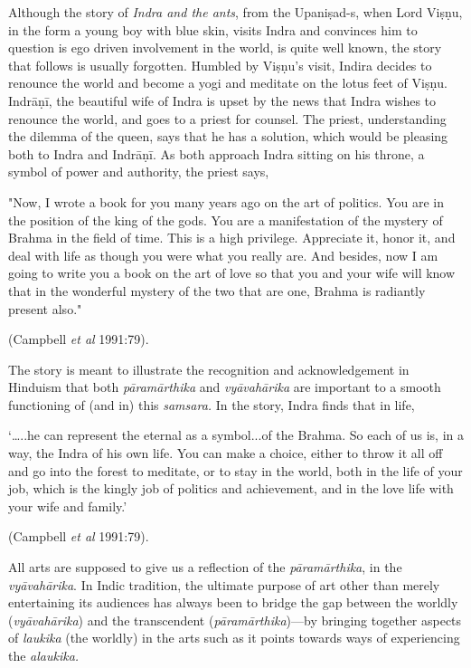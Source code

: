 Although the story of \textsl{Indra and the ants}, from the Upaniṣad-s, when Lord Viṣṇu, in the form a young boy with blue skin, visits Indra and convinces him to question is ego driven involvement in the world, is quite well known, the story that follows is usually forgotten. Humbled by Viṣṇu’s visit, Indira decides to renounce the world and become a yogi and meditate on the lotus feet of Viṣṇu. Indrāṇī, the beautiful wife of Indra is upset by the news that Indra wishes to renounce the world, and goes to a priest for counsel. The priest, understanding the dilemma of the queen, says that he has a solution, which would be pleasing both to Indra and Indrāṇī. As both approach Indra sitting on his throne, a symbol of power and authority, the priest says, 

\begin{myquote}
"Now, I wrote a book for you many years ago on the art of politics. You are in the position of the king of the gods. You are a manifestation of the mystery of Brahma in the field of time. This is a high privilege. Appreciate it, honor it, and deal with life as though you were what you really are. And besides, now I am going to write you a book on the art of love so that you and your wife will know that in the wonderful mystery of the two that are one, Brahma is radiantly present also." 

\hfill (Campbell \textsl{et al} 1991:79).
\end{myquote}

The story is meant to illustrate the recognition and acknowledgement in Hinduism that both \textsl{pāramārthika} and \textsl{vyāvahārika} are important to a smooth functioning of (and in) this \textsl{samsara.} In the story, Indra finds that in life, 

\begin{myquote}
‘…..he can represent the eternal as a symbol...of the Brahma. So each of us is, in a way, the Indra of his own life. You can make a choice, either to throw it all off and go into the forest to meditate, or to stay in the world, both in the life of your job, which is the kingly job of politics and achievement, and in the love life with your wife and family.’

\hfill (Campbell \textsl{et al} 1991:79).
\end{myquote}

All arts are supposed to give us a reflection of the \textsl{pāramārthika}, in the \textsl{vyāvahārika}. In Indic tradition, the ultimate purpose of art other than merely entertaining its audiences has always been to bridge the gap between the worldly (\textsl{vyāvahārika}) and the transcendent (\textsl{pāramārthika})---by bringing together aspects of \textsl{laukika} (the worldly) in the arts such as it points towards ways of experiencing the \textsl{alaukika.}



